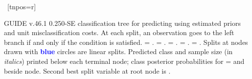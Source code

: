 \documentclass{article}
\begin{document}
\begin{landscape}
\begin{center}
{{{{    ~[tnpos=r]{}
    ~{}
   }
   }
 }
 }
 \end{center}
GUIDE v.46.1 0.250-SE
classification tree for predicting \texttt{} using
estimated priors
and unit misclassification costs.
At each split, an observation goes to the left branch 
 if and only if the condition is satisfied.
\texttt{} = \texttt{}.
\texttt{} = \texttt{}.
\texttt{} = \texttt{}.
\texttt{} = \texttt{}.
\texttt{} = \texttt{}.
 Splits at nodes drawn with \textbf{\textcolor{blue}{blue}} circles are linear splits.
Predicted class and sample size (in \emph{italics}) printed below each terminal node;
class posterior probabilities for \texttt{} =
 \texttt{} and \texttt{} beside node.
 Second best split variable at root node is \texttt{}.
 \end{landscape}
 
\end{document}
